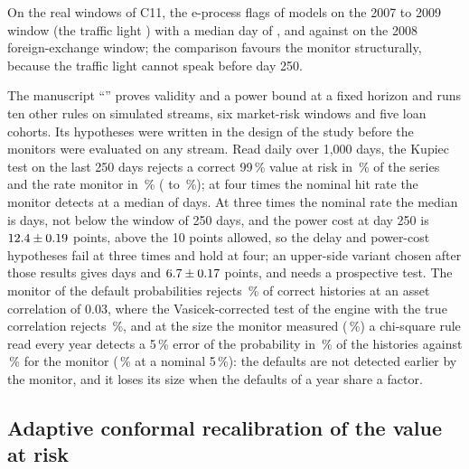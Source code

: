 On the real windows of C11, the e-process flags \pxFifteenCeSevenFlag{} of \pxFifteenCeSevenModels{} models on the 2007 to 2009 window (the traffic light \pxFifteenCeSevenLight{}) with a median day of \pxFifteenCeSevenDay{}, and \pxFifteenCeFxFlag{} against \pxFifteenCeFxLight{} on the 2008 foreign-exchange window; the comparison favours the monitor structurally, because the traffic light cannot speak before day 250.

The manuscript ``\pxPaperTitleFifteen{}'' proves validity and a power bound at a fixed horizon and runs ten other rules on simulated streams, six market-risk windows and five loan cohorts. Its hypotheses
were written in the design of the study before the monitors were evaluated on any stream. Read daily over 1,000 days, the Kupiec test on the last 250 days rejects a correct 99\,\% value at risk in
\pxPpFifteenKupTrail{}\,\% of the series and the rate monitor in \pxPpFifteenENull{}\,\% (\pxPpFifteenENullLo{} to \pxPpFifteenENullHi{}\,\%); at four times the nominal hit rate the monitor detects at a median of
\pxPpFifteenFourMed{} days. At three times the nominal rate the median is \pxPpFifteenThreeMed{} days, not below the window of 250 days, and the power cost at day 250 is
$12.4\pm0.19$ points, above the 10 points allowed, so the delay and power-cost hypotheses fail at three times and hold at four; an upper-side variant chosen after those
results gives \pxPpFifteenUpThreeMed{} days and $6.7\pm0.17$ points, and needs a prospective test. The monitor of the default probabilities rejects
\pxPpFifteenRhoAvg{}\,\% of correct histories at an asset correlation of 0.03, where the Vasicek-corrected test of the engine with the true correlation rejects \pxPpFifteenVasTrue{}\,\%, and at the size the monitor
measured (\pxPpFifteenMatchedSize{}\,\%) a chi-square rule read every year detects a 5\,\% error of the probability in \pxPpFifteenChiMatched{}\,\% of the histories against \pxPpFifteenPdAvg{}\,\% for the
monitor (\pxPpFifteenChiSim{}\,\% at a nominal 5\,\%): the defaults are not detected earlier by the monitor, and it loses its size when the defaults of a year share a factor.

\subsection{Adaptive conformal recalibration of the value at risk}
\label{sec:bs16}

